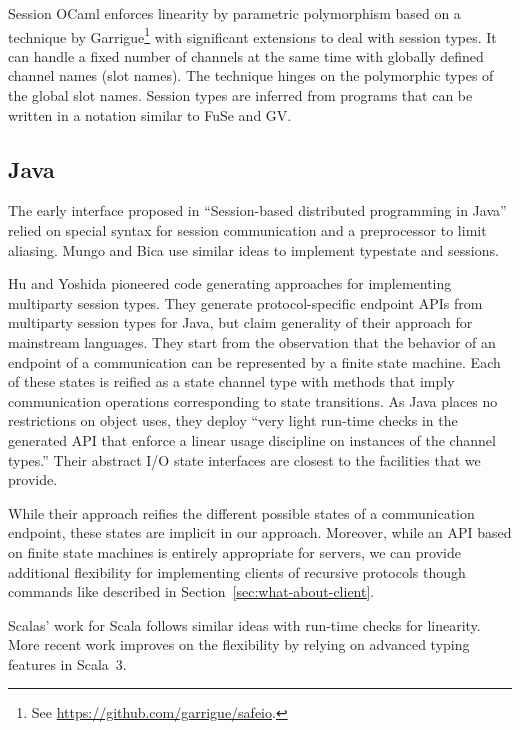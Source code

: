 \documentclass[acmsmall,screen]{acmart}
\begin{document}
Session OCaml \cite{DBLP:journals/scp/ImaiYY19} enforces linearity by
parametric polymorphism based on a technique by
Garrigue\footnote{See \url{https://github.com/garrigue/safeio}.} with significant
extensions to deal with session types.
It can handle a fixed number of channels at the same time with
globally defined channel names (slot names). The technique hinges on
the polymorphic types of the global slot names.
Session types are inferred from programs that can be written in a notation
similar to FuSe and GV.


\subsection{Java}
\label{sec:java}

The early interface proposed in ``Session-based distributed programming in Java''
\cite{DBLP:conf/ecoop/HuYH08} relied on special syntax for session
communication and a preprocessor to limit aliasing.
Mungo \cite{DBLP:journals/scp/KouzapasDPG18} and Bica
\cite{DBLP:journals/corr/abs-1205-5344} use similar ideas to implement
typestate and sessions.

Hu and Yoshida \cite{DBLP:conf/fase/HuY16} pioneered code generating
approaches for implementing multiparty session types. They generate protocol-specific
endpoint APIs from multiparty session  
types for Java, but claim generality of their approach for mainstream
languages. They start from the observation that the behavior of an
endpoint of a communication can be represented by a finite state
machine. Each of these states is reified as a state channel type with
methods that imply communication operations corresponding to state
transitions. As Java places no restrictions on object uses, they
deploy ``very light run-time checks in the 
generated API that enforce a linear usage discipline on instances of
the channel types.'' Their abstract I/O state interfaces are closest
to the facilities that we provide.

While their approach reifies the different possible states of a
communication endpoint, these states are implicit in our
approach. Moreover, while an API based on finite state machines is
entirely appropriate for servers, we can provide additional
flexibility for implementing clients of recursive protocols though
commands like {\AUNROLL} described in
Section~\ref{sec:what-about-client}.

Scalas' work for Scala \cite{DBLP:conf/ecoop/ScalasY16} follows similar
ideas with run-time checks for linearity. More recent work
\cite{DBLP:conf/ecoop/CledouEJP22} improves on the flexibility by
relying on advanced typing features in Scala~3.
\end{document}
